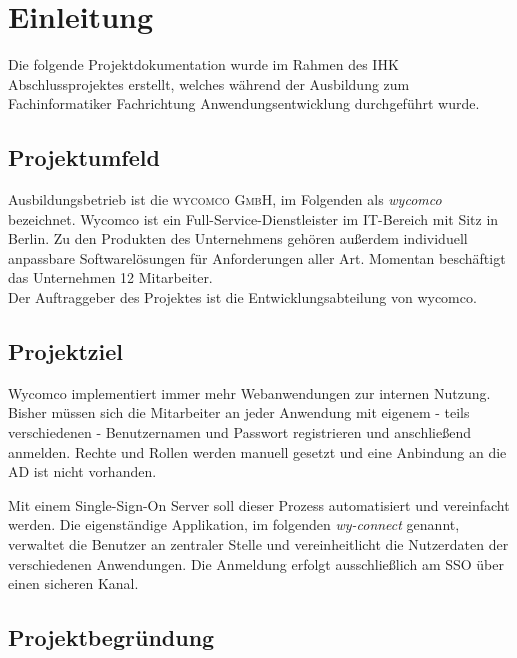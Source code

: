 \section{Einleitung}
\label{sec:Einleitung}

Die folgende Projektdokumentation wurde im Rahmen des IHK Abschlussprojektes erstellt, welches während der Ausbildung zum Fachinformatiker Fachrichtung Anwendungsentwicklung durchgeführt wurde.

\subsection{Projektumfeld} 
\label{sec:Projektumfeld}

Ausbildungsbetrieb ist die \textsc{wycomco GmbH}, im Folgenden als \textit{wycomco} bezeichnet. Wycomco ist ein Full-Service-Dienstleister im IT-Bereich mit Sitz in Berlin. Zu den Produkten des Unternehmens gehören außerdem individuell anpassbare Softwarelösungen für Anforderungen aller Art. Momentan beschäftigt das Unternehmen 12 Mitarbeiter. \\

Der Auftraggeber des Projektes ist die Entwicklungsabteilung von wycomco. 


\subsection{Projektziel} 
\label{sec:Projektziel}

Wycomco implementiert immer mehr Webanwendungen zur internen Nutzung. Bisher müssen sich die Mitarbeiter an jeder Anwendung mit eigenem - teils verschiedenen - Benutzernamen und Passwort registrieren und anschließend anmelden. Rechte und Rollen werden manuell gesetzt und eine Anbindung an die \acs{AD} ist nicht vorhanden.

Mit einem Single-Sign-On Server soll dieser Prozess automatisiert und vereinfacht werden. Die eigenständige Applikation, im folgenden \textit{wy-connect} genannt, verwaltet die Benutzer an zentraler Stelle und vereinheitlicht die Nutzerdaten der verschiedenen Anwendungen. Die Anmeldung erfolgt ausschließlich am SSO über einen sicheren Kanal. \\

\subsection{Projektbegründung} 
\label{sec:Projektbegruendung}

